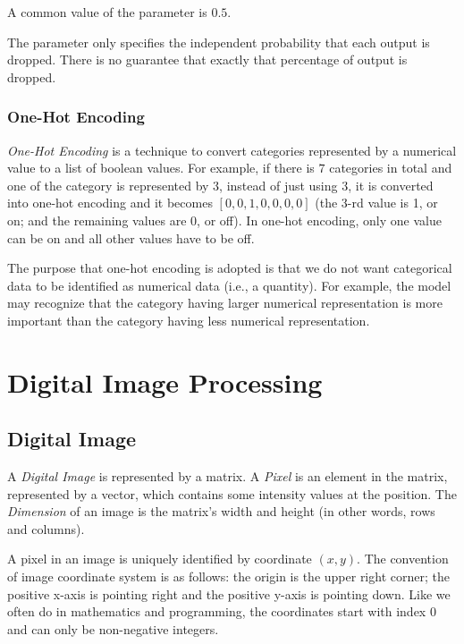 \documentclass{note}
\begin{document}
\begin{tip}
    A common value of the parameter is $0.5$.
\end{tip}

\begin{note}
    The parameter only specifies the independent probability that each output is dropped. There is no guarantee that exactly that percentage of output is dropped. 
\end{note}

\subsection{One-Hot Encoding}

\textit{One-Hot Encoding} is a technique to convert categories represented by a numerical value to a list of boolean values. For example, if there is $7$ categories in total and one of the category is represented by $3$, instead of just using $3$, it is converted into one-hot encoding and it becomes $[0, 0, 1, 0, 0, 0, 0]$ (the 3-rd value is 1, or on; and the remaining values are 0, or off). In one-hot encoding, only one value can be on and all other values have to be off.

The purpose that one-hot encoding is adopted is that we do not want categorical data to be identified as numerical data (i.e., a quantity). For example, the model may recognize that the category having larger numerical representation is more important than the category having less numerical representation.

\chapter{Digital Image Processing}

\section{Digital Image}

A \textit{Digital Image} is represented by a matrix. A \textit{Pixel} is an element in the matrix, represented by a vector, which contains some intensity values at the position. The \textit{Dimension} of an image is the matrix's width and height (in other words, rows and columns).

A pixel in an image is uniquely identified by coordinate $(x, y)$. The convention of image coordinate system is as follows: the origin is the upper right corner; the positive x-axis is pointing right and the positive y-axis is pointing down. Like we often do in mathematics and programming, the coordinates start with index 0 and can only be non-negative integers.
\end{document}
